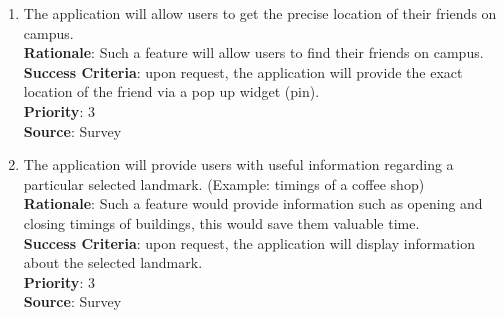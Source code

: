 \documentclass[10pt,a4paper,oneside]{report}
\begin{document}
{\begin{enumerate}
\item{The application will allow users to get the precise location of their friends on campus.\\
  \textbf{Rationale}: Such a feature will allow users to find their friends on campus.\\
  \textbf{Success Criteria}: upon request, the application will provide the exact location of the friend via a pop up widget (pin).\\
  \textbf{Priority}: 3\\
  \textbf{Source}: Survey
}

\item{The application will provide users with useful  information regarding a particular selected landmark. (Example: timings of a coffee shop)\\
  \textbf{Rationale}: Such a feature would provide information such as opening and closing timings of buildings, this would save them valuable time.\\
  \textbf{Success Criteria}: upon request, the application will display information about the selected landmark.\\
  \textbf{Priority}: 3\\
  \textbf{Source}: Survey
}
\end{enumerate}
}
\end{document}
